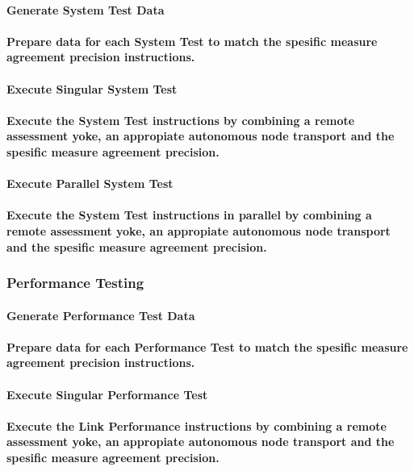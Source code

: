 \documentclass{acm_proc_article-sp}
\begin{document}
\paragraph{Generate System Test Data}
\paragraph{Prepare data for each System Test to match the spesific measure agreement precision instructions.}
\paragraph{Execute Singular System Test}
\paragraph{Execute the System Test instructions by combining a remote assessment yoke, an appropiate autonomous node transport and the spesific measure agreement precision.}
\paragraph{Execute Parallel System Test}
\paragraph{Execute the System Test instructions in parallel by combining a remote assessment yoke, an appropiate autonomous node transport and the spesific measure agreement precision.}
\subsubsection{Performance Testing}
\paragraph{Generate Performance Test Data}
\paragraph{Prepare data for each Performance Test to match the spesific measure agreement precision instructions.}
\paragraph{Execute Singular Performance Test}
\paragraph{Execute the Link Performance instructions by combining a remote assessment yoke, an appropiate autonomous node transport and the spesific measure agreement precision.}
\end{document}
